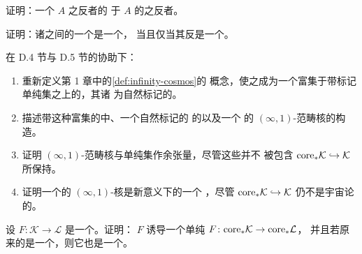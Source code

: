 \begin{exercise}\label{ex:homotopy-category-of-opposite}
证明：一个\trInfinityCategory{} $A$ 之反者的\trHomotopyCategory\trEquivalence{}%
于 $A$ 的\trHomotopyCategory{}之反者。
\end{exercise}

\begin{exercise}\label{ex:opposite-of-equivalence}
证明：诸\trInfinityCategory{}之间的一个\trFunctor{}是一个\trEquivalence，
当且仅当其反\trFunctor{}是一个\trEquivalence。
\end{exercise}

\begin{exercise}\label{ex:marked-enrichment-core}
在 D.4 节与 D.5 节的协助下：
\begin{enumerate}[label=(\roman*)]
\item 重新定义第 1 章中的\cref{def:infinity-cosmos}的\trInfinityCosmos{}%
  概念，使之成为一个富集于带标记单纯集之上的\trCategory{}，其诸%
  \trFunctorSpace{}为自然标记的\trQuasiCategory。
\item 描述带这种富集的\trInfinityCosmos{}中、一个自然标记的%
  \trQuasiCategory{}的\trInfinityGroupoidCore{}以及一个\trInfinityCosmos{}%
  的 $(\infty,1)$-范畴核的构造。
\item 证明 $(\infty,1)$-范畴核与单纯集作余张量，尽管这些\trCotensor{}并不
  被包含 $\mathrm{core}_{\ast}\mathcal{K}\hookrightarrow\mathcal{K}$ 所保持。
\item 证明一个\trInfinityCosmos{}的 $(\infty,1)$-核是新意义下的一个%
  \trInfinityCosmos{}，尽管\trFunctor{}
  $\mathrm{core}_{\ast}\mathcal{K}\hookrightarrow\mathcal{K}$ 仍不是宇宙论的。
\end{enumerate}
\end{exercise}

\begin{exercise}\label{ex:core-functor-biequivalence}
设 $F\colon\mathcal{K}\to\mathcal{L}$ 是一个\trCosmologicalFunctor。证明：
$F$ 诱导一个单纯\trFunctor{} $F\colon\mathrm{core}_{\ast}\mathcal{K}\to\mathrm{core}_{\ast}\mathcal{L}$，
并且若原来的\trFunctor{}是一个\trBiequivalence，则它也是一个\trBiequivalence。
\end{exercise}

